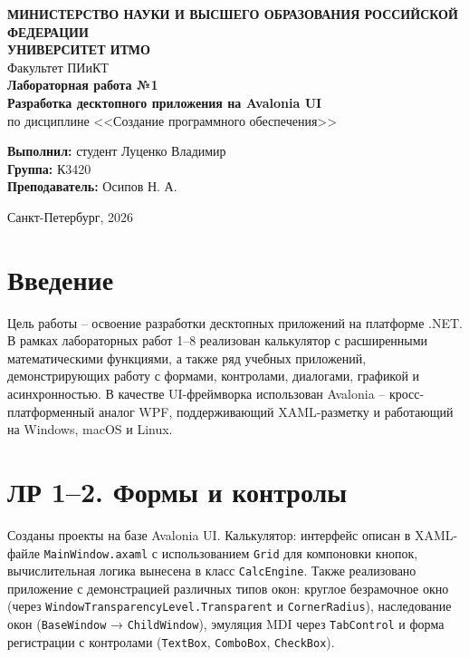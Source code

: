 \documentclass[14pt,a4paper]{extarticle}
\begin{document}
\thispagestyle{empty}
\begin{center}
\textbf{МИНИСТЕРСТВО НАУКИ И ВЫСШЕГО ОБРАЗОВАНИЯ РОССИЙСКОЙ ФЕДЕРАЦИИ}\\[0.3cm]
\textbf{УНИВЕРСИТЕТ ИТМО}\\[0.5cm]
Факультет ПИиКТ\\[1.5cm]

\textbf{\Large Лабораторная работа №1}\\[0.5cm]
\textbf{\large Разработка десктопного приложения на Avalonia UI}\\[0.5cm]
по дисциплине <<Создание программного обеспечения>>\\[2cm]
\end{center}

\begin{flushleft}
\hspace{1.25cm}\begin{minipage}[t]{\dimexpr\textwidth-1.25cm\relax}
\textbf{Выполнил:} студент Луценко Владимир\\
\textbf{Группа:} К3420\\
\textbf{Преподаватель:} Осипов Н. А.\\
\end{minipage}
\end{flushleft}

\vfill
\begin{center}
Санкт-Петербург, 2026
\end{center}
\newpage

\tableofcontents
\newpage

\section{Введение}

Цель работы -- освоение разработки десктопных приложений на платформе .NET. В рамках лабораторных работ 1--8 реализован калькулятор с расширенными математическими функциями, а также ряд учебных приложений, демонстрирующих работу с формами, контролами, диалогами, графикой и асинхронностью. В качестве UI-фреймворка использован Avalonia -- кросс-платформенный аналог WPF, поддерживающий XAML-разметку и работающий на Windows, macOS и Linux.

\section{ЛР 1--2. Формы и контролы}

Созданы проекты на базе Avalonia UI. Калькулятор: интерфейс описан в XAML-файле \texttt{MainWindow.axaml} с использованием \texttt{Grid} для компоновки кнопок, вычислительная логика вынесена в класс \texttt{CalcEngine}. Также реализовано приложение с демонстрацией различных типов окон: круглое безрамочное окно (через \texttt{WindowTransparencyLevel.Transparent} и \texttt{CornerRadius}), наследование окон (\texttt{BaseWindow} → \texttt{ChildWindow}), эмуляция MDI через \texttt{TabControl} и форма регистрации с контролами (\texttt{TextBox}, \texttt{ComboBox}, \texttt{CheckBox}).
\end{document}
